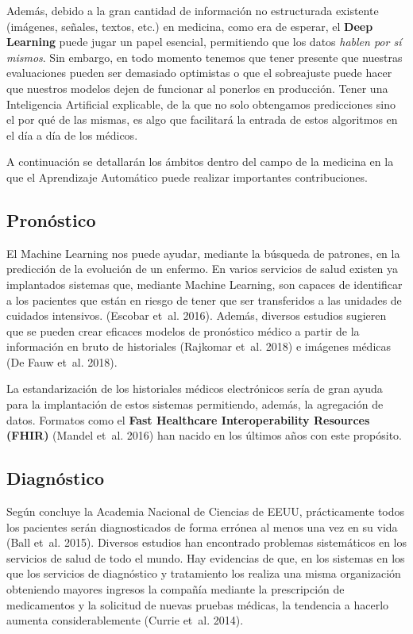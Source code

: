 \documentclass[
  12pt,
  spanish,
  a4paperpaper,
]{report}
\begin{document}
Además, debido a la gran cantidad de información no estructurada
existente (imágenes, señales, textos, etc.) en medicina, como era de
esperar, el \textbf{Deep Learning} puede jugar un papel esencial,
permitiendo que los datos \emph{hablen por sí mismos}. Sin embargo, en
todo momento tenemos que tener presente que nuestras evaluaciones pueden
ser demasiado optimistas o que el sobreajuste puede hacer que nuestros
modelos dejen de funcionar al ponerlos en producción. Tener una
Inteligencia Artificial explicable, de la que no solo obtengamos
predicciones sino el por qué de las mismas, es algo que facilitará la
entrada de estos algoritmos en el día a día de los médicos.

A continuación se detallarán los ámbitos dentro del campo de la medicina
en la que el Aprendizaje Automático puede realizar importantes
contribuciones.

\hypertarget{pronuxf3stico}{%
\subsection{Pronóstico}\label{pronuxf3stico}}

El Machine Learning nos puede ayudar, mediante la búsqueda de patrones,
en la predicción de la evolución de un enfermo. En varios servicios de
salud existen ya implantados sistemas que, mediante Machine Learning,
son capaces de identificar a los pacientes que están en riesgo de tener
que ser transferidos a las unidades de cuidados intensivos. (Escobar
et~al. 2016). Además, diversos estudios sugieren que se pueden crear
eficaces modelos de pronóstico médico a partir de la información en
bruto de historiales (Rajkomar et~al. 2018) e imágenes médicas (De Fauw
et~al. 2018).

La estandarización de los historiales médicos electrónicos sería de gran
ayuda para la implantación de estos sistemas permitiendo, además, la
agregación de datos. Formatos como el \textbf{Fast Healthcare
Interoperability Resources (FHIR)} (Mandel et~al. 2016) han nacido en
los últimos años con este propósito.

\hypertarget{diagnuxf3stico}{%
\subsection{Diagnóstico}\label{diagnuxf3stico}}

Según concluye la Academia Nacional de Ciencias de EEUU, prácticamente
todos los pacientes serán diagnosticados de forma errónea al menos una
vez en su vida (Ball et~al. 2015). Diversos estudios han encontrado
problemas sistemáticos en los servicios de salud de todo el mundo. Hay
evidencias de que, en los sistemas en los que los servicios de
diagnóstico y tratamiento los realiza una misma organización obteniendo
mayores ingresos la compañía mediante la prescripción de medicamentos y
la solicitud de nuevas pruebas médicas, la tendencia a hacerlo aumenta
considerablemente (Currie et~al. 2014).
\end{document}
